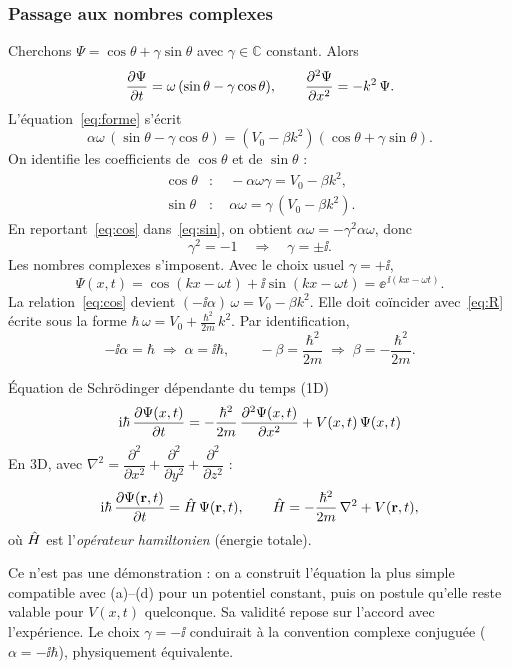 \subsubsection{Passage aux nombres complexes}

Cherchons $\Psi = \cos\theta + \gamma\sin\theta$ avec $\gamma\in\mathbb{C}$
constant. Alors
\[
  \dfrac{\partial \Psi}{\partial t} = \omega\,(\sin\theta - \gamma\cos\theta),
  \qquad
  \dfrac{\partial^{2} \Psi}{\partial x^{2}} = -k^2\,\Psi .
\]
L'équation~\eqref{eq:forme} s'écrit
\[
  \alpha\omega\,(\sin\theta - \gamma\cos\theta) = (V_0 - \beta k^2)(\cos\theta + \gamma\sin\theta).
\]
On identifie les coefficients de $\cos\theta$ et de $\sin\theta$ :
\begin{align}
  \cos\theta &:\quad -\alpha\omega\gamma = V_0 - \beta k^2, \label{eq:cos}\\
  \sin\theta &:\quad \alpha\omega = \gamma\,(V_0 - \beta k^2). \label{eq:sin}
\end{align}
En reportant~\eqref{eq:cos} dans~\eqref{eq:sin}, on obtient
$\alpha\omega = -\gamma^2\alpha\omega$, donc
\[
  \gamma^2 = -1 \quad\Longrightarrow\quad \gamma = \pm\ii .
\]
Les nombres complexes s'imposent. Avec le choix usuel $\gamma = +\ii$,
\[
  \Psi(x,t) = \cos(kx-\omega t) + \ii\sin(kx-\omega t) = \ee^{\,\ii(kx-\omega t)} .
\]
La relation~\eqref{eq:cos} devient $(-\ii\alpha)\,\omega = V_0 - \beta k^2$. Elle
doit coïncider avec~\eqref{eq:R} écrite sous la forme
$\hbar\,\omega = V_0 + \tfrac{\hbar^2}{2m}\,k^2$. Par identification,
\[
  -\ii\alpha = \hbar \;\Longrightarrow\; \alpha = \ii\hbar,
  \qquad
  -\beta = \frac{\hbar^2}{2m} \;\Longrightarrow\; \beta = -\frac{\hbar^2}{2m}.
\]

\begin{resultat}{Équation de Schrödinger dépendante du temps (1D)}
\[
  \mathrm{i}\hbar\,\dfrac{\partial \Psi(x,t)}{\partial t}
  = -\frac{\hbar^2}{2m}\,\dfrac{\partial^{2} \Psi(x,t)}{\partial x^{2}} + V(x,t)\,\Psi(x,t)
\]
En 3D, avec $\nabla^2 = \dfrac{\partial^2}{\partial x^2}+\dfrac{\partial^2}{\partial y^2}+\dfrac{\partial^2}{\partial z^2}$ :
\[
  \mathrm{i}\hbar\,\dfrac{\partial \Psi(\mathbf{r},t)}{\partial t} = \hat{H}\,\Psi(\mathbf{r},t),
  \qquad
  \hat{H} = -\frac{\hbar^2}{2m}\,\nabla^2 + V(\mathbf{r},t),
\]
où $\hat{H}$ est l'\emph{opérateur hamiltonien} (énergie totale).
\end{resultat}

\begin{remarque}
Ce n'est pas une démonstration : on a construit l'équation la plus simple
compatible avec (a)--(d) pour un potentiel constant, puis on postule qu'elle
reste valable pour $V(x,t)$ quelconque. Sa validité repose sur l'accord avec
l'expérience. Le choix $\gamma=-\ii$ conduirait à la convention complexe
conjuguée ($\alpha = -\ii\hbar$), physiquement équivalente.
\end{remarque}

